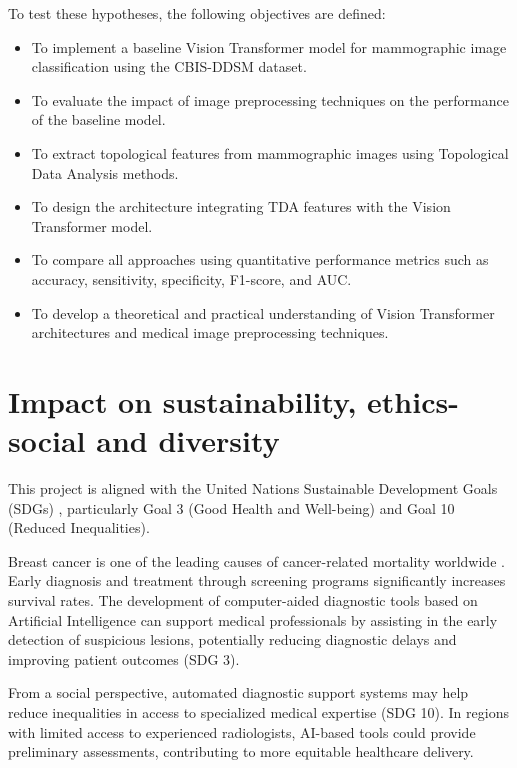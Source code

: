 \documentclass[ENG]{TFUOC}%
\begin{document}
To test these hypotheses, the following objectives are defined:

\begin{itemize}
    \item To implement a baseline Vision Transformer model for mammographic image classification using the CBIS-DDSM dataset.
    
    \item To evaluate the impact of image preprocessing techniques on the performance of the baseline model.
    
    \item To extract topological features from mammographic images using Topological Data Analysis methods.
    
    \item To design the architecture integrating TDA features with the Vision Transformer model.
    
    \item To compare all approaches using quantitative performance metrics such as accuracy, sensitivity, specificity, F1-score, and AUC.
    
    \item To develop a theoretical and practical understanding of Vision Transformer architectures and medical image preprocessing techniques.
\end{itemize}

\section{Impact on sustainability, ethics-social and diversity}
\label{s:etic}

This project is aligned with the United Nations Sustainable Development Goals (SDGs) \cite{un_sustainable_dev_goals}, particularly Goal 3 (Good Health and Well-being) and Goal 10 (Reduced Inequalities).

Breast cancer is one of the leading causes of cancer-related mortality worldwide \cite{who_cancer_2024}. Early diagnosis and treatment through screening programs significantly increases survival rates. The development of computer-aided diagnostic tools based on Artificial Intelligence can support medical professionals by assisting in the early detection of suspicious lesions, potentially reducing diagnostic delays and improving patient outcomes (SDG 3).

From a social perspective, automated diagnostic support systems may help reduce inequalities in access to specialized medical expertise (SDG 10). In regions with limited access to experienced radiologists, AI-based tools could provide preliminary assessments, contributing to more equitable healthcare delivery.
\end{document}
